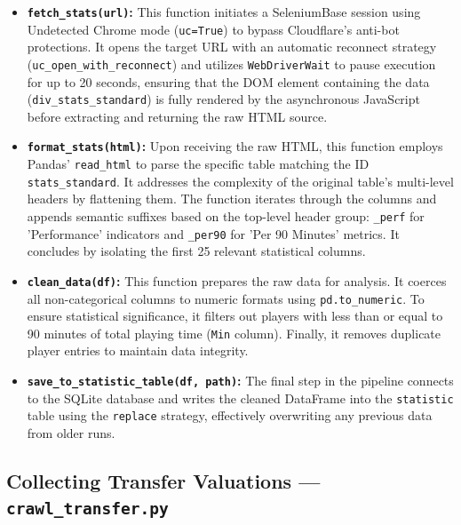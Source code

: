 \documentclass[a4paper,12pt]{report}
\begin{document}
\begin{itemize}
    \item \textbf{\texttt{fetch\_stats(url)}:} This function initiates a SeleniumBase session using Undetected Chrome mode (\texttt{uc=True}) to bypass Cloudflare's anti-bot protections. It opens the target URL with an automatic reconnect strategy (\texttt{uc\_}\allowbreak\texttt{open\_}\allowbreak\texttt{with\_}\allowbreak\texttt{reconnect}) and utilizes \texttt{WebDriverWait} to pause execution for up to 20 seconds, ensuring that the DOM element containing the data (\texttt{div\_}\allowbreak\texttt{stats\_}\allowbreak\texttt{standard}) is fully rendered by the asynchronous JavaScript before extracting and returning the raw HTML source.
    
    \item \textbf{\texttt{format\_stats(html)}:} Upon receiving the raw HTML, this function employs Pandas' \texttt{read\_html} to parse the specific table matching the ID \texttt{stats\_standard}. It addresses the complexity of the original table's multi-level headers by flattening them. The function iterates through the columns and appends semantic suffixes based on the top-level header group: \texttt{\_perf} for 'Performance' indicators and \texttt{\_per90} for 'Per 90 Minutes' metrics. It concludes by isolating the first 25 relevant statistical columns.
    
    \item \textbf{\texttt{clean\_data(df)}:} This function prepares the raw data for analysis. It coerces all non-categorical columns to numeric formats using \texttt{pd.to\_numeric}. To ensure statistical significance, it filters out players with less than or equal to 90 minutes of total playing time (\texttt{Min} column). Finally, it removes duplicate player entries to maintain data integrity.
    
    \item \textbf{\texttt{save\_to\_statistic\_table(df, path)}:} The final step in the pipeline connects to the SQLite database and writes the cleaned DataFrame into the \texttt{statistic} table using the \texttt{replace} strategy, effectively overwriting any previous data from older runs.
\end{itemize}

\subsection{Collecting Transfer Valuations --- \texttt{crawl\_transfer.py}}
\end{document}
